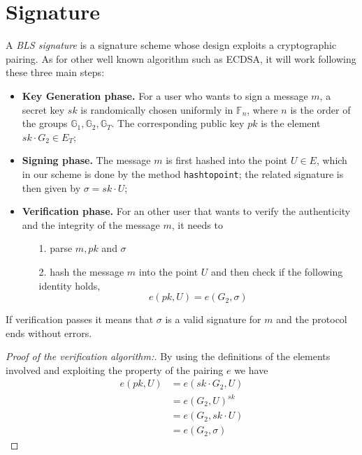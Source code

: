 \documentclass[twocolumn]{article}
\begin{document}
\section{Signature}
\label{sec:signature}

A \emph{BLS signature} is a signature scheme whose design exploits a cryptographic pairing. As for other well known algorithm such as ECDSA, it will work following these three main steps:
\begin{itemize}
    \item  \textbf{Key Generation phase.} For a user who wants to sign a message $m$, a secret key $sk$ is randomically chosen uniformly in $\mathbb{F}_n$, where $n$ is the order of the groups $\mathbb{G}_1, \mathbb{G}_2, \mathbb{G}_T$. The corresponding public key $pk$ is the element $sk\cdot G_2\in E_T$;
    \item   \textbf{Signing phase.} The message $m$ is first hashed
      into the point $U\in E$, which in our scheme is done by the
      method \verb!hashtopoint!; the related signature is then given
      by $\sigma = sk\cdot U$;
    \item   \textbf{Verification phase.} For an other user that wants to verify the authenticity and the integrity of the message $m$, it needs to
    \begin{itemize}
        \item [1.] parse $m, pk$ and $\sigma$
        \item [2.] hash the message $m$ into the point $U$ and then check if the following identity holds,
        \[
        e(pk,U) = e(G_2,\sigma)
        \]
    \end{itemize}
\end{itemize}
If verification passes it means that $\sigma$ is a valid signature for $m$ and the protocol ends without errors.
\begin{proof}
 [Proof of the verification algorithm:] By using the definitions of the elements involved and exploiting the property of the pairing $e$ we have
\[
\begin{split}
    e(pk,U) &= e(sk\cdot G_2, U) \\
            &= e(G_2,U)^{sk}\\
            &= e(G_2,sk\cdot U)\\
            &= e(G_2,\sigma)
\end{split}
\]
\end{proof}
\end{document}
